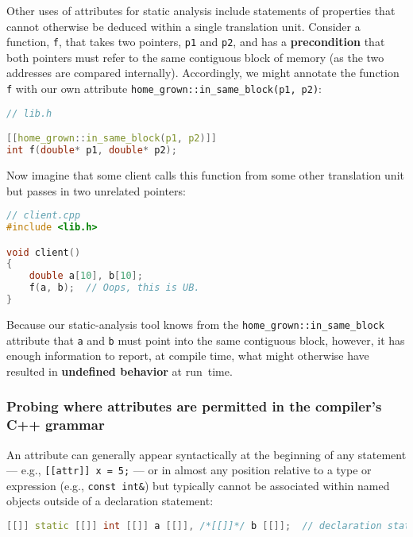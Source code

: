 Other uses of attributes for static analysis include statements of
properties that cannot otherwise be deduced within a single translation
unit. Consider a function, \texttt{f}, that takes two pointers,
\texttt{p1} and \texttt{p2}, and has a \textbf{precondition} that both
pointers must refer to the same contiguous block of memory (as the two
addresses are compared internally). Accordingly, we might annotate the
function \texttt{f} with our own attribute
\texttt{home\_grown::in\_same\_block(p1,}~\texttt{p2)}:

\begin{lstlisting}[language=C++]
// lib.h

[[home_grown::in_same_block(p1, p2)]]
int f(double* p1, double* p2);
\end{lstlisting}

\noindent Now imagine that some client calls this function from some other
translation unit but passes in two unrelated pointers:

\begin{lstlisting}[language=C++]
// client.cpp
#include <lib.h>

void client()
{
    double a[10], b[10];
    f(a, b);  // Oops, this is UB.
}
\end{lstlisting}

\noindent Because our static-analysis tool knows from the
\texttt{home\_grown::in\_same\_block} attribute that \texttt{a} and
\texttt{b} must point into the same contiguous block, however, it has
enough information to report, at compile time, what might otherwise have
resulted in \textbf{undefined behavior} at run~time.

\subsubsection[Probing where attributes are permitted in the compiler’s C++ grammar]{Probing where attributes are permitted in the compiler’s C++ grammar}\label{probing-where-attributes-are-permitted-in-the-compiler’s-c++-grammar}

An attribute can generally appear syntactically at the beginning of any
statement --- e.g.,
\texttt{[[attr]]}~\texttt{x}~\texttt{=}~\texttt{5;} --- or in almost any
position relative to a type or expression (e.g.,
\texttt{const}~\texttt{int\&}) but typically cannot be associated
within named objects outside of a declaration statement:

\begin{lstlisting}[language=C++]
[[]] static [[]] int [[]] a [[]], /*[[]]*/ b [[]];  // declaration statement
\end{lstlisting}

